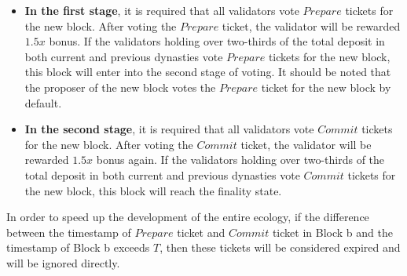 
\begin{itemize}

\item \textbf{In the first stage}, it is required that all validators vote $Prepare$ tickets for the new block. After voting the $Prepare$ ticket, the validator will be rewarded $1.5x$ bonus. If the validators holding over two-thirds of the total deposit in both current and previous dynasties vote $Prepare$ tickets for the new block, this block will enter into the second stage of voting. It should be noted that the proposer of the new block votes the $Prepare$ ticket for the new block by default.


\item \textbf{In the second stage}, it is required that all validators vote $Commit$ tickets for the new block. After voting the $Commit$ ticket, the validator will be rewarded $1.5x$ bonus again. If the validators holding over two-thirds of the total deposit in both current and previous dynasties vote $Commit$ tickets for the new block, this block will reach the finality state.

\end{itemize}

In order to speed up the development of the entire ecology, if the difference between the timestamp of $Prepare$ ticket and $Commit$ ticket in Block b and the timestamp of Block b exceeds $T$, then these tickets will be considered expired and will be ignored directly.


